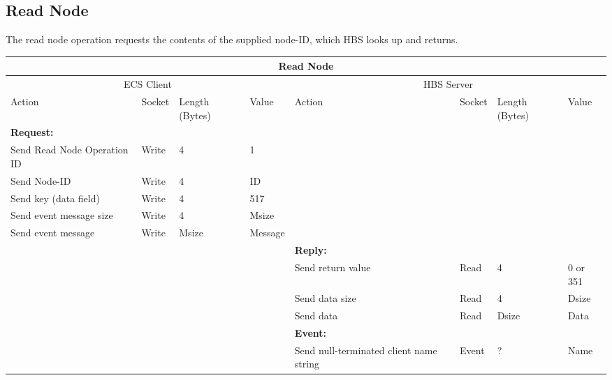 \newpage
\subsection{Read Node}

The read node operation requests the contents of the supplied node-ID, 
which HBS looks up and returns.  


\bigskip
\small
\begin{tabular}{|p{1.2in}|p{.4in}|p{.4in}|p{.5in}|p{1.2in}|p{.4in}|p{.4in}|p{.5in} |} \hline
\multicolumn{8}{|c|}{{\bf Read Node}} \\ \hline
\multicolumn{4}{|c|}{ECS Client} & \multicolumn{4}{|c|}{HBS Server} \\ \hline
Action            & Socket & Length  
                            (Bytes)& Value & Action       & Socket & Length 
                                                                    (Bytes)& Value \\ \hline
\multicolumn{4}{|l}{{\bf Request:}}&\multicolumn{4}{|l|}{~} \\ \hline
Send Read Node Operation ID   & Write  & 4     & 1     &              &        &       &       \\ \hline
Send Node-ID      & Write  & 4     &  ID &           &        &       &       \\ \hline
Send key (data field)    & Write  & 4     & 517   &              &        &       &       \\ \hline
Send event
message size      & Write  & 4     &  Msize &         &        &       &       \\ \hline
Send event message
                  & Write  &  Msize  &  Message &     &        &       &       \\ \hline
\multicolumn{4}{|l}{~}&\multicolumn{4}{|l|}{{\bf Reply:}} \\ \hline
                  &        &       &       & Send return
                                             value        & Read   &  4    & 0 or 351      \\ \hline
                  &        &       &       & Send data size & Read &  4    &  Dsize \\ \hline
                  &        &       &       & Send data    & Read   & Dsize &  Data \\ \hline
\multicolumn{4}{|l}{~}&\multicolumn{4}{|l|}{{\bf Event:}} \\ \hline
                  &        &       &       & Send null-terminated client
                                             name string  & Event  &  ?    & Name  \\ \hline

\end{tabular}
